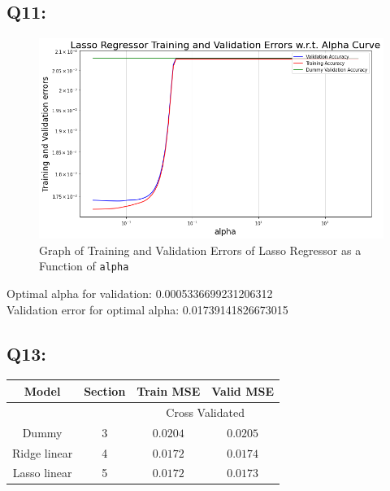 \documentclass{article}
\newcommand{\code}[1]{\texttt{#1}}
\begin{document}
\subsection*{Q11:}
    \begin{figure}[H]
        \centering
        \includegraphics[scale=0.5]{q11.png}
        \caption{Graph of Training and Validation Errors of Lasso Regressor as a Function of \code{alpha}}
        \label{fig:q7}
    \end{figure}
    Optimal alpha for validation: 0.0005336699231206312\\
    Validation error for optimal alpha: 0.01739141826673015

\subsection*{Q13:}
    \begin{center}
        \begin{tabular}{|c|c|c|c|}
            \hline
            \rowcolor{gray!60}
            Model & Section & Train MSE & Valid MSE\\ \hline
            \rowcolor{gray!20}
            ~&~ & \multicolumn{2}{c|}{Cross Validated}\\ \hline
            Dummy & 3 & $0.0204$ & $0.0205$\\ \hline
            Ridge linear & 4 & $0.0172$ & $0.0174$\\ \hline
            Lasso linear & 5 & $0.0172$ & $0.0173$\\ \hline
        \end{tabular}
    \end{center}
\end{document}
